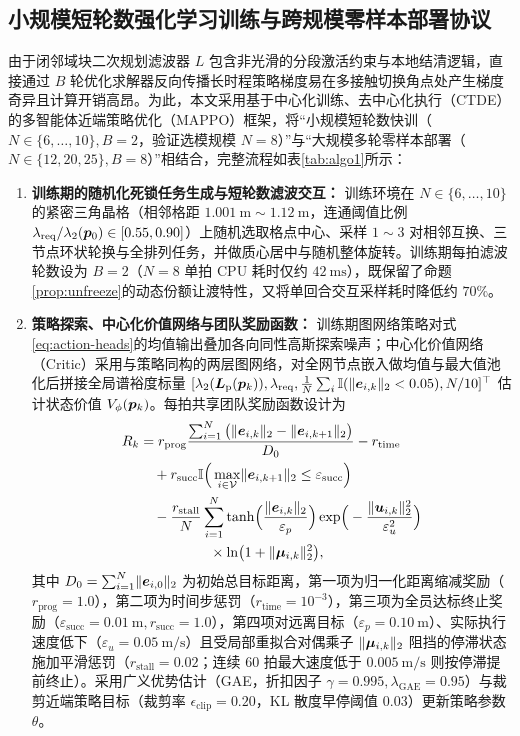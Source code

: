 \subsection{小规模短轮数强化学习训练与跨规模零样本部署协议}\label{subsec:mappo}
由于闭邻域块二次规划滤波器 $L$ 包含非光滑的分段激活约束与本地结清逻辑，直接通过 $B$ 轮优化求解器反向传播长时程策略梯度易在多接触切换角点处产生梯度奇异且计算开销高昂。为此，本文采用基于中心化训练、去中心化执行（CTDE）的多智能体近端策略优化（MAPPO）框架\cite{yu2022mappo}，将“小规模短轮数快训（$N\in\{6,\dots,10\},B=2$，验证选模规模 $N=8$）”与“大规模多轮零样本部署（$N\in\{12,20,25\},B=8$）”相结合，完整流程如表\ref{tab:algo1}所示：
\begin{enumerate}
 \item \textbf{训练期的随机化死锁任务生成与短轮数滤波交互：} 训练环境在 $N\in\{6,\dots,10\}$ 的紧密三角晶格（相邻格距 $1.001\ \mathrm m\sim 1.12\ \mathrm m$，连通阈值比例 $\lambda_{\mathrm{req}}/\lambda_2(\boldsymbol{p}_0)\in[0.55,0.90]$）上随机选取格点中心、采样 $1\sim 3$ 对相邻互换、三节点环状轮换与全排列任务，并做质心居中与随机整体旋转。训练期每拍滤波轮数设为 $B=2$（$N=8$ 单拍 CPU 耗时仅约 $42\ \mathrm{ms}$），既保留了命题\ref{prop:unfreeze}的动态份额让渡特性，又将单回合交互采样耗时降低约 $70\%$。
 \item \textbf{策略探索、中心化价值网络与团队奖励函数：} 训练期图网络策略对式\eqref{eq:action-heads}的均值输出叠加各向同性高斯探索噪声；中心化价值网络（Critic）采用与策略同构的两层图网络，对全网节点嵌入做均值与最大值池化后拼接全局谱裕度标量 $[\lambda_2(\boldsymbol{L}_{\mathrm{p}}(\boldsymbol{p}_k)),\lambda_{\mathrm{req}},\tfrac1N\sum_i\mathbb I(\lVert\boldsymbol{e}_{i,k}\rVert_2<0.05),N/10]^{\top}$ 估计状态价值 $V_\phi(\boldsymbol{p}_k)$。每拍共享团队奖励函数设计为
 \begin{equation}
 \begin{split}
  R_k &= r_{\mathrm{prog}}\frac{\sum_{i=1}^N\big(\lVert\boldsymbol{e}_{i,k}\rVert_2-\lVert\boldsymbol{e}_{i,k+1}\rVert_2\big)}{D_0} - r_{\mathrm{time}}\\
  &\quad + r_{\mathrm{succ}}\mathbb I\Big(\max_{i\in\mathcal V}\lVert\boldsymbol{e}_{i,k+1}\rVert_2\le\varepsilon_{\mathrm{succ}}\Big)\\
  &\quad - \frac{r_{\mathrm{stall}}}{N}\sum_{i=1}^N\tanh\!\Big(\frac{\lVert\boldsymbol{e}_{i,k}\rVert_2}{\varepsilon_p}\Big)\exp\!\Big(-\frac{\lVert\boldsymbol{u}_{i,k}\rVert_2^2}{\varepsilon_u^2}\Big)\\
  &\quad\qquad\qquad\times\ln\!\big(1+\lVert\boldsymbol\mu_{i,k}\rVert_2^2\big),
 \end{split}\label{eq:reward}
 \end{equation}
 其中 $D_0=\sum_{i=1}^N\lVert\boldsymbol{e}_{i,0}\rVert_2$ 为初始总目标距离，第一项为归一化距离缩减奖励（$r_{\mathrm{prog}}=1.0$），第二项为时间步惩罚（$r_{\mathrm{time}}=10^{-3}$），第三项为全员达标终止奖励（$\varepsilon_{\mathrm{succ}}=0.01\ \mathrm m,r_{\mathrm{succ}}=1.0$），第四项对远离目标（$\varepsilon_p=0.10\ \mathrm m$）、实际执行速度低下（$\varepsilon_u=0.05\ \mathrm{m/s}$）且受局部重拟合对偶乘子 $\lVert\boldsymbol\mu_{i,k}\rVert_2$ 阻挡的停滞状态施加平滑惩罚（$r_{\mathrm{stall}}=0.02$；连续 $60$ 拍最大速度低于 $0.005\ \mathrm{m/s}$ 则按停滞提前终止）。采用广义优势估计（GAE，折扣因子 $\gamma=0.995,\lambda_{\mathrm{GAE}}=0.95$）与裁剪近端策略目标（裁剪率 $\epsilon_{\mathrm{clip}}=0.20$，KL 散度早停阈值 $0.03$）更新策略参数 $\theta$。

\end{enumerate}
